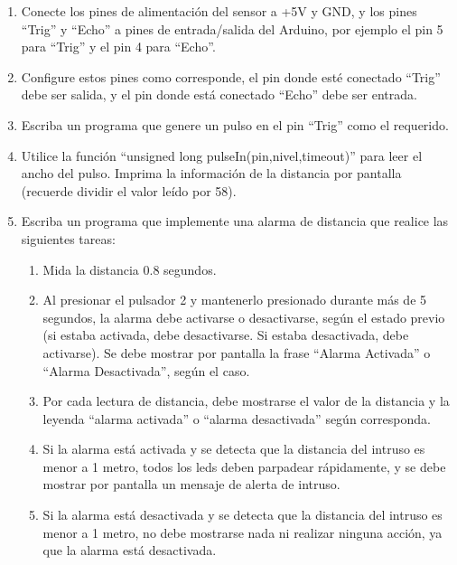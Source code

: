 \documentclass{article}
\begin{document}
\begin{enumerate}[leftmargin=0pt]
\item Conecte los pines de alimentación del sensor a +5V y GND, y los pines “Trig” y “Echo” a pines de entrada/salida del Arduino, por ejemplo el pin 5 para “Trig” y el pin 4 para “Echo”.

\item Configure estos pines como corresponde, el pin donde esté conectado “Trig” debe ser salida, y el pin donde está conectado “Echo” debe ser entrada.

\item Escriba un programa que genere un pulso en el pin “Trig” como el requerido.

\item Utilice la función “unsigned long pulseIn(pin,nivel,timeout)” para leer el ancho del pulso. Imprima la información de la distancia por pantalla (recuerde dividir el valor leído por 58).

\item Escriba un programa que implemente una alarma de distancia que realice las siguientes tareas:
\begin{enumerate}
    \item Mida la distancia 0.8 segundos.
    \item Al presionar el pulsador 2 y mantenerlo presionado durante más de 5 segundos, la alarma debe activarse o desactivarse, según el estado previo (si estaba activada, debe desactivarse. Si estaba desactivada, debe activarse). Se debe mostrar por pantalla la frase “Alarma Activada” o “Alarma Desactivada”, según el caso.
    \item Por cada lectura de distancia, debe mostrarse el valor de la distancia y la leyenda “alarma activada” o “alarma desactivada” según corresponda.
    \item Si la alarma está activada y se detecta que la distancia del intruso es menor a 1 metro, todos los leds deben parpadear rápidamente, y se debe mostrar por pantalla un mensaje de alerta de intruso.
    \item Si la alarma está desactivada y se detecta que la distancia del intruso es menor a 1 metro, no debe mostrarse nada ni realizar ninguna acción, ya que la alarma está desactivada.
\end{enumerate}
\end{enumerate}
\end{document}
